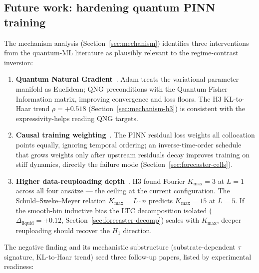 \subsection{Future work: hardening quantum PINN training}
\label{sec:discussion-future}

The mechanism analysis (Section~\ref{sec:mechanism}) identifies
three interventions from the quantum-ML literature as plausibly
relevant to the regime-contrast inversion:

\begin{enumerate}
  \item \textbf{Quantum Natural
        Gradient}~\cite{stokes2020quantum}. Adam treats the
        variational parameter manifold as Euclidean; QNG
        preconditions with the Quantum Fisher Information matrix,
        improving convergence and loss floors. The H3 KL-to-Haar
        trend $\rho = +0.518$ (Section~\ref{sec:mechanism-h3})
        is consistent with the expressivity-helps reading QNG
        targets.

  \item \textbf{Causal training
        weighting}~\cite{wang2022causality}. The PINN residual
        loss weights all collocation points equally, ignoring
        temporal ordering; an inverse-time-order schedule that
        grows weights only after upstream residuals decay
        improves training on stiff dynamics, directly the \vdp{}
        failure mode (Section~\ref{sec:forecaster-cells}).

  \item \textbf{Higher data-reuploading
        depth}~\cite{schuld2021effect}. H3 found Fourier
        $K_{\max} = 3$ at $L = 1$ across all four ansätze --- the
        ceiling at the current configuration. The
        Schuld--Sweke--Meyer relation $K_{\max} = L \cdot n$
        predicts $K_{\max} = 15$ at $L = 5$. If the smooth-bin
        inductive bias the LTC decomposition isolated
        ($\Delta_\text{liquid} = +0.12$,
        Section~\ref{sec:forecaster-decomp}) scales with
        $K_{\max}$, deeper reuploading should recover the $H_1$
        direction.
\end{enumerate}

The negative finding and its mechanistic substructure
(substrate-dependent $\tau$ signature, KL-to-Haar trend) seed
three follow-up papers, listed by experimental readiness:

